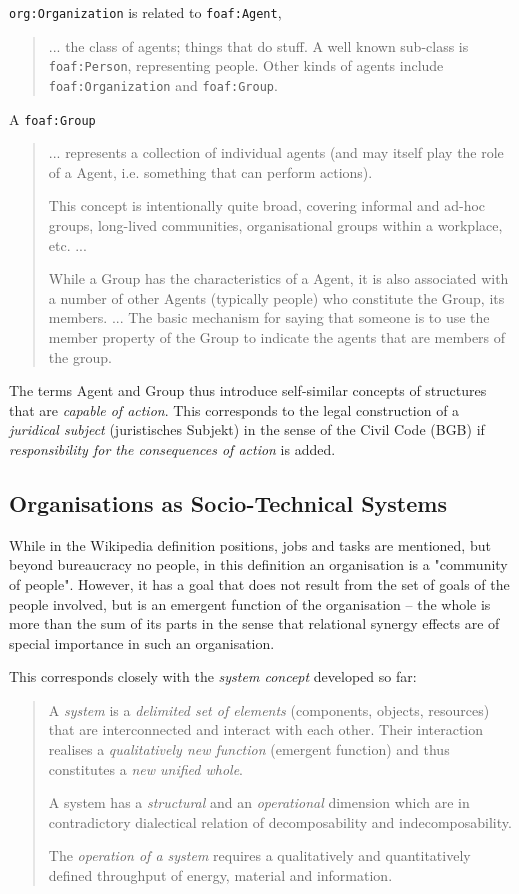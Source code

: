 \documentclass[11pt,a4paper]{article}
\begin{document}
\texttt{org:Organization} is related to \texttt{foaf:Agent}, 
\begin{quote}\raggedright
  ... the class of agents; things that do stuff. A well known sub-class is
  \texttt{foaf:Person}, representing people. Other kinds of agents include
  \texttt{foaf:Organization} and \texttt{foaf:Group}. \cite{foaf}
\end{quote}

A \texttt{foaf:Group}
\begin{quote}
  ... represents a collection of individual agents (and may itself play the
  role of a Agent, i.e. something that can perform actions).

  This concept is intentionally quite broad, covering informal and ad-hoc
  groups, long-lived communities, organisational groups within a workplace,
  etc. ...
  
  While a Group has the characteristics of a Agent, it is also associated with
  a number of other Agents (typically people) who constitute the Group, its
  members. ...  The basic mechanism for saying that someone is to use the
  member property of the Group to indicate the agents that are members of the
  group.
\end{quote}
The terms Agent and Group thus introduce self-similar concepts of structures
that are \emph{capable of action}. This corresponds to the legal construction
of a \emph{juridical subject} (juristisches Subjekt) in the sense of the Civil
Code (BGB) if \emph{responsibility for the consequences of action} is added.

\subsection{Organisations as Socio-Technical Systems}

While in the Wikipedia definition positions, jobs and tasks are mentioned, but
beyond bureaucracy no people, in this definition an organisation is a
"community of people". However, it has a goal that does not result from the
set of goals of the people involved, but is an emergent function of the
organisation -- the whole is more than the sum of its parts in the sense that
relational synergy effects are of special importance in such an organisation.

This corresponds closely with the \emph{system concept} developed so far:
\begin{quote}
  A \emph{system} is a \emph{delimited set of elements} (components, objects,
  resources) that are interconnected and interact with each other. Their
  interaction realises a \emph{qualitatively new function} (emergent function)
  and thus constitutes a \emph{new unified whole}.

  A system has a \emph{structural} and an \emph{operational} dimension which
  are in contradictory dialectical relation of decomposability and
  indecomposability.

  The \emph{operation of a system} requires a qualitatively and quantitatively
  defined throughput of energy, material and information.
\end{quote}
\end{document}
